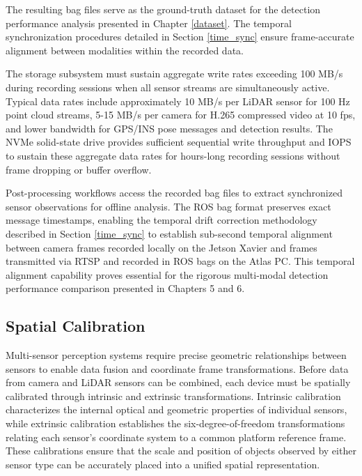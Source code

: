 The resulting bag files serve as the ground-truth dataset for the detection performance analysis presented in Chapter \ref{dataset}.
The temporal synchronization procedures detailed in Section \ref{time_sync} ensure frame-accurate alignment between modalities within the recorded data.

The storage subsystem must sustain aggregate write rates exceeding 100 MB/s during recording sessions when all sensor streams are simultaneously active.
Typical data rates include approximately 10 MB/s per LiDAR sensor for 100 Hz point cloud streams, 5-15 MB/s per camera for H.265 compressed video at 10 fps, and lower bandwidth for GPS/INS pose messages and detection results.
The NVMe solid-state drive provides sufficient sequential write throughput and IOPS to sustain these aggregate data rates for hours-long recording sessions without frame dropping or buffer overflow.

Post-processing workflows access the recorded bag files to extract synchronized sensor observations for offline analysis.
The ROS bag format preserves exact message timestamps, enabling the temporal drift correction methodology described in Section \ref{time_sync} to establish sub-second temporal alignment between camera frames recorded locally on the Jetson Xavier and frames transmitted via RTSP and recorded in ROS bags on the Atlas PC.
This temporal alignment capability proves essential for the rigorous multi-modal detection performance comparison presented in Chapters 5 and 6.




\subsection{Spatial Calibration} \label{spatial_calibration}

Multi-sensor perception systems require precise geometric relationships between sensors to enable data fusion and coordinate frame transformations.
Before data from camera and LiDAR sensors can be combined, each device must be spatially calibrated through intrinsic and extrinsic transformations.
Intrinsic calibration characterizes the internal optical and geometric properties of individual sensors, while extrinsic calibration establishes the six-degree-of-freedom transformations relating each sensor's coordinate system to a common platform reference frame.
These calibrations ensure that the scale and position of objects observed by either sensor type can be accurately placed into a unified spatial representation.


